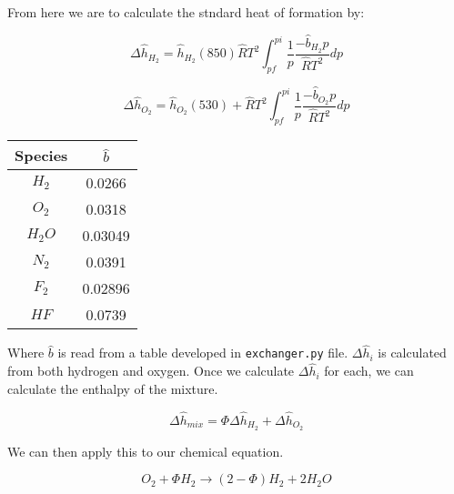 \documentclass[12pt, Times New Roman]{article}
\begin{document}
    \vspace*{6pt}

    From here we are to calculate the stndard heat of formation by:
    
    \begin{equation}
        \Delta \hat{h}_{H_{2}} = \hat{h}_{H_{2}}(850) \hat{R}T^{2}\int^{pi}_{pf} \frac{1}{p} \frac{-\hat{b}_{H_{2}}p}{\hat{R}T^{2}} dp
    \end{equation}

    \vspace*{6pt}

    \begin{equation}
        \Delta \hat{h}_{O_{2}} = \hat{h}_{O_{2}}(530) + \hat{R}T^{2}\int^{pi}_{pf} \frac{1}{p} \frac{-\hat{b}_{O_{2}}p}{\hat{R}T^{2}} dp
    \end{equation}

    \begin{center}
        \begin{tabular}{|c|c|}
            \hline
            Species & $\hat{b}$ \\
            \hline
            $H_{2}$ & 0.0266 \\
            \hline
            $O_{2}$ & 0.0318 \\
            \hline
            $H_{2}O$ & 0.03049 \\
            \hline
            $N_{2}$ & 0.0391 \\
            \hline
            $F_{2}$ & 0.02896 \\
            \hline
            $HF$ & 0.0739 \\
            \hline
        \end{tabular}
    \end{center}
    
    Where $\hat{b}$ is read from a table developed in \verb|exchanger.py| file. $\Delta \hat{h}_{i}$ is calculated from both 
    hydrogen and oxygen. Once we calculate $\Delta \hat{h}_{i}$ for each, we can calculate the enthalpy of the mixture.

    \begin{equation}
        \Delta \hat{h}_{mix} = \Phi \Delta \hat{h}_{H_{2}} + \Delta \hat{h}_{O_{2}}
    \end{equation}
    
    We can then apply this to our chemical equation.

    \begin{equation}
        O_{2} + \Phi H_{2} \rightarrow (2-\Phi)H_{2} +2H_{2}O
    \end{equation}
\end{document}

